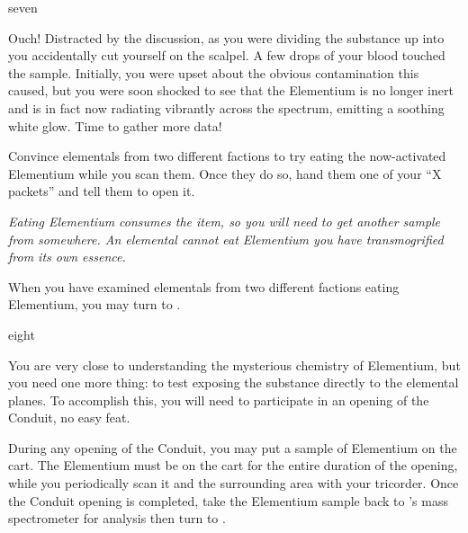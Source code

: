 \documentclass[notebook]{elementals}
\begin{document}
\begin{page}{seven}

Ouch! Distracted by the discussion, as you were dividing the substance up into you accidentally cut yourself on the scalpel. A few drops of your blood touched the sample. Initially, you were upset about the obvious contamination this caused, but you were soon shocked to see that the Elementium is no longer inert and is in fact now radiating vibrantly across the spectrum, emitting a soothing white glow. Time to gather more data!

Convince elementals from two different factions to try eating the now-activated Elementium while you scan them. Once they do so, hand them one of your ``X packets'' and tell them to open it.

\emph{Eating Elementium consumes the item, so you will need to get another sample from somewhere. An elemental cannot eat Elementium you have transmogrified from its own essence.}

When you have examined elementals from two different factions eating Elementium, you may turn to .

\end{page}

\begin{page}{eight}

You are very close to understanding the mysterious chemistry of Elementium, but you need one more thing: to test exposing the substance directly to the elemental planes. To accomplish this, you will need to participate in an opening of the Conduit, no easy feat.

During any opening of the Conduit, you may put a sample of Elementium on the cart. The Elementium must be on the cart for the entire duration of the opening, while you periodically scan it and the surrounding area with your tricorder. Once the Conduit opening is completed, take the Elementium sample back to \cGD{}'s mass spectrometer for analysis then turn to .

\end{page}
\end{document}
